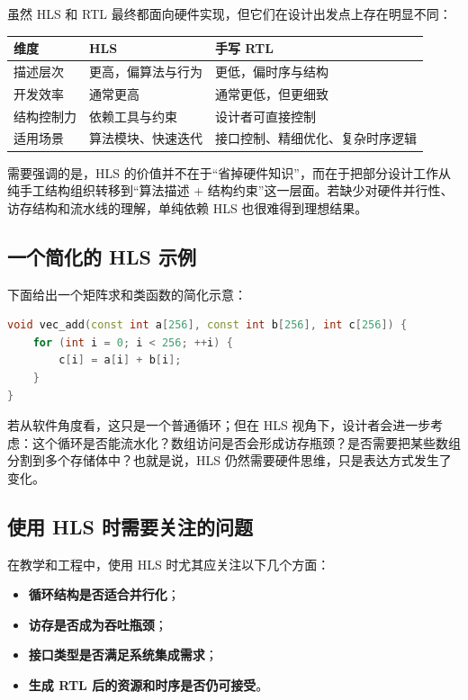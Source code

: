 虽然 HLS 和 RTL 最终都面向硬件实现，但它们在设计出发点上存在明显不同：

\begin{longtable}[]{@{}lll@{}}
\toprule\noalign{}
维度 & HLS & 手写 RTL \\
\midrule\noalign{}
\endhead
\bottomrule\noalign{}
\endlastfoot
描述层次 & 更高，偏算法与行为 & 更低，偏时序与结构 \\
开发效率 & 通常更高 & 通常更低，但更细致 \\
结构控制力 & 依赖工具与约束 & 设计者可直接控制 \\
适用场景 & 算法模块、快速迭代 & 接口控制、精细优化、复杂时序逻辑 \\
\end{longtable}

需要强调的是，HLS
的价值并不在于``省掉硬件知识''，而在于把部分设计工作从纯手工结构组织转移到``算法描述
+
结构约束''这一层面。若缺少对硬件并行性、访存结构和流水线的理解，单纯依赖
HLS 也很难得到理想结果。

\subsection{一个简化的 HLS
示例}\label{ux4e00ux4e2aux7b80ux5316ux7684-hls-ux793aux4f8b}

下面给出一个矩阵求和类函数的简化示意：

\begin{lstlisting}[language={C++}]
void vec_add(const int a[256], const int b[256], int c[256]) {
    for (int i = 0; i < 256; ++i) {
        c[i] = a[i] + b[i];
    }
}
\end{lstlisting}

若从软件角度看，这只是一个普通循环；但在 HLS
视角下，设计者会进一步考虑：这个循环是否能流水化？数组访问是否会形成访存瓶颈？是否需要把某些数组分割到多个存储体中？也就是说，HLS
仍然需要硬件思维，只是表达方式发生了变化。

\subsection{使用 HLS
时需要关注的问题}\label{ux4f7fux7528-hls-ux65f6ux9700ux8981ux5173ux6ce8ux7684ux95eeux9898}

在教学和工程中，使用 HLS 时尤其应关注以下几个方面：

\begin{itemize}
\tightlist
\item
  \textbf{循环结构是否适合并行化}；
\item
  \textbf{访存是否成为吞吐瓶颈}；
\item
  \textbf{接口类型是否满足系统集成需求}；
\item
  \textbf{生成 RTL 后的资源和时序是否仍可接受}。
\end{itemize}

